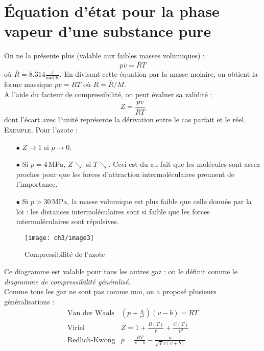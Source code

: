 \section{Équation d'état pour la phase vapeur d'une substance pure}
On ne la présente plus (valable aux faibles masses volumiques) :
\begin{equation}
	p\overline{v} = \overline{R}T
\end{equation}
où $\overline{R} = 8.314 \mathrm{\frac{J}{mol.K}}$. En divisant cette 
équation par la masse molaire, on obtient la forme massique $pv = 
RT$ où $R = \overline{R}/M$.\\
A l'aide du facteur de compressibilité, on peut évaluer sa 
validité :
\begin{equation}
	Z = \frac{p\overline{v}}{\overline{R}T}
\end{equation}
dont l'écart avec l'unité représente la dérivation entre le cas 
parfait et le réel.\\

\textsc{Exemple}. Pour l'azote :
\begin{itemize}
	\item[$\bullet$] $Z \rightarrow 1$ si $p \rightarrow 0$.
	\item[$\bullet$] Si $p = 4\,\mathrm{MPa}$, $Z \searrow$ si $T \searrow$. Ceci 
	      est du au fait que les molécules sont assez proches pour que les 
	      forces d'attraction intermoléculaires prennent de l'importance.
	\item[$\bullet$] Si $p > 30\,\mathrm{MPa}$, la masse volumique est plus faible 
	      que celle donnée par la loi : les distances intermoléculaires sont 
	      si faible que les forces intermoléculaires sont répulsives.
\end{itemize}
\begin{figure}[H]
	\centering
	\texttt{[image: ch3/image3]}
	\caption{Compressibilité de l'azote}
\end{figure}
Ce diagramme est valable pour tous les autres gaz : on le définit 
comme le \textit{diagramme de compressibilité généralisé}.\\

Comme tous les gaz ne sont pas comme moi, on a proposé plusieurs 
généralisations :
\begin{equation}
	\begin{array}{ll}
		\text{Van der Waals} & \left(p+\frac{a}{v^2}\right)(v-b) = RT      \\
		\text{Viriel}        & Z = 1+\frac{B(T)}{v} + \frac{C(T)}{v^2}     \\
		\text{Redlich-Kwong} & p = \frac{RT}{v-b}-\frac{a}{\sqrt{T}v(v+b)} 
	\end{array}
\end{equation}


